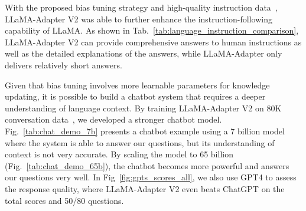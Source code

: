 \documentclass[10pt,twocolumn,letterpaper]{article}
\begin{document}
With the proposed bias tuning strategy and high-quality instruction data~\cite{peng2023instruction}, LLaMA-Adapter V2 was able to further enhance the instruction-following capability of LLaMA. 
As shown in Tab.~\ref{tab:language_instruction_comparison}, LLaMA-Adapter V2 can provide comprehensive answers to human instructions
as well as the detailed explanations of the answers, while LLaMA-Adapter only delivers relatively short answers.

Given that bias tuning involves more learnable parameters for knowledge updating, it is possible to build a chatbot system that requires a deeper understanding of language context. 
By training LLaMA-Adapter V2 on 80K conversation data~\cite{sharegpt}, we developed a stronger chatbot model. 
Fig.~\ref{tab:chat_demo_7b} presents a chatbot example using a 7 billion model where the system is able to answer our questions, but its understanding of context is not very accurate. 
By scaling the model to 65 billion (Fig.~\ref{tab:chat_demo_65b}), the chatbot becomes more powerful and answers our questions very well. In Fig~\ref{fig:gpts_scores_all}, we also use GPT4 to assess the response quality, where LLaMA-Adapter V2 even beats ChatGPT on the total scores and 50/80 questions.
\end{document}
